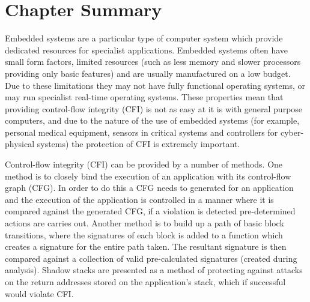 \section{Chapter Summary}
Embedded systems are a particular type of computer system which provide dedicated resources for specialist applications. Embedded systems often have small form factors, limited resources (such as less memory and slower processors providing only basic features) and are usually manufactured on a low budget. Due to these limitations they may not have fully functional operating systems, or may run specialist real-time operating systems. These properties mean that providing control-flow integrity (CFI) is not as easy at it is with general purpose computers, and due to the nature of the use of embedded systems (for example, personal medical equipment, sensors in critical systems and controllers for cyber-physical systems) the protection of CFI is extremely important.

Control-flow integrity (CFI) can be provided by a number of methods. One method is to closely bind the execution of an application with its control-flow graph (CFG). In order to do this a CFG needs to generated for an application and the execution of the application is controlled in a manner where it is compared against the generated CFG, if a violation is detected pre-determined actions are carries out. Another method is to build up a path of basic block transitions, where the signatures of each block is added to a function which creates a signature for the entire path taken. The resultant signature is then compared against a collection of valid pre-calculated signatures (created during analysis). Shadow stacks are presented as a method of protecting against attacks on the return addresses stored on the application's stack, which if successful would violate CFI.